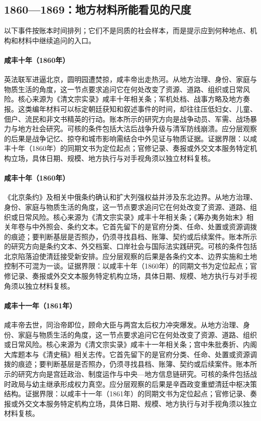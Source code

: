 \subsection{1860—1869：地方材料所能看见的尺度}
以下事件按账本时间排列；它们不是同质的社会样本，而是提示应到何种地点、机构和材料中继续追问的入口。
\hypertarget{social:EQ-1860-BEIJING-CAMPAIGN}{}\paragraph{咸丰十年（1860年）}英法联军进逼北京，圆明园遭焚掠，咸丰帝出走热河。从地方治理、身份、家庭与物质生活的角度，这一节点要求追问它在何处改变了资源、道路、组织或日常风险。核心来源为《清文宗实录》咸丰十年相关条；军机处档、战事方略及地方奏报。这类编年材料可以标定朝廷获知和叙述事件的时间，却往往压低妇女、儿童、佃户、流民和非文书精英的行动。账本所示的研究方向是战争动员、军需、战场暴力与地方社会研究。可核的条件包括大沽后战争升级与清军防线崩溃。应分层观察的后果是战争记忆、掠夺和城市影响需结合中外见证与物质证据。证据界限：以咸丰十年（1860年）的同期文书为定位起点；官修记录、奏报或外交文本服务特定机构立场，具体日期、规模、地方执行与对手视角须以独立材料复核。
\hypertarget{social:EQ-1860-CONVENTION-OF-PEKING}{}\paragraph{咸丰十年（1860年）}《北京条约》及相关中俄条约确认和扩大列强权益并涉及东北边界。从地方治理、身份、家庭与物质生活的角度，这一节点要求追问它在何处改变了资源、道路、组织或日常风险。核心来源为《清文宗实录》咸丰十年相关条；《筹办夷务始末》相关年卷与中外照会、条约文本。它首先留下的是官府分类、任命、处置或资源调拨的痕迹；要判断基层是否照办，仍须寻找县档、账簿、契约或后续案件。账本所示的研究方向是条约文本、外交档案、口岸社会与国际法实践研究。可核的条件包括北京陷落迫使清廷接受新安排。应分层观察的后果是各条约文本、边界实施和土地控制不可混为一谈。证据界限：以咸丰十年（1860年）的同期文书为定位起点；官修记录、奏报或外交文本服务特定机构立场，具体日期、规模、地方执行与对手视角须以独立材料复核。
\hypertarget{social:EQ-1861-XIANFENG-DEATH}{}\paragraph{咸丰十一年（1861年）}咸丰帝去世，同治帝即位，顾命大臣与两宫太后权力冲突爆发。从地方治理、身份、家庭与物质生活的角度，这一节点要求追问它在何处改变了资源、道路、组织或日常风险。核心来源为《清文宗实录》咸丰十一年相关条；宫中朱批奏折、内阁大库题本与《清史稿》相关志传。它首先留下的是官府分类、任命、处置或资源调拨的痕迹；要判断基层是否照办，仍须寻找县档、账簿、契约或后续案件。账本所示的研究方向是宫廷政治、制度运作与中央—地方信息链研究。可核的条件包括战时政局与幼主继承形成权力真空。应分层观察的后果是辛酉政变重塑清廷中枢决策结构。证据界限：以咸丰十一年（1861年）的同期文书为定位起点；官修记录、奏报或外交文本服务特定机构立场，具体日期、规模、地方执行与对手视角须以独立材料复核。
